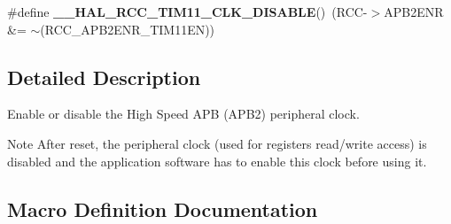 \begin{DoxyCompactItemize}
\item 
\#define {\bfseries \+\_\+\+\_\+\+H\+A\+L\+\_\+\+R\+C\+C\+\_\+\+T\+I\+M11\+\_\+\+C\+L\+K\+\_\+\+D\+I\+S\+A\+B\+LE}()~(R\+CC-\/$>$A\+P\+B2\+E\+NR \&= $\sim$(R\+C\+C\+\_\+\+A\+P\+B2\+E\+N\+R\+\_\+\+T\+I\+M11\+EN))\hypertarget{group___r_c_c___a_p_b2___clock___enable___disable_ga2ea675ace35a7a536c9f4cec522f28bc}{}\label{group___r_c_c___a_p_b2___clock___enable___disable_ga2ea675ace35a7a536c9f4cec522f28bc}

\end{DoxyCompactItemize}


\subsection{Detailed Description}
Enable or disable the High Speed A\+PB (A\+P\+B2) peripheral clock. 

\begin{DoxyNote}{Note}
After reset, the peripheral clock (used for registers read/write access) is disabled and the application software has to enable this clock before using it. 
\end{DoxyNote}


\subsection{Macro Definition Documentation}
